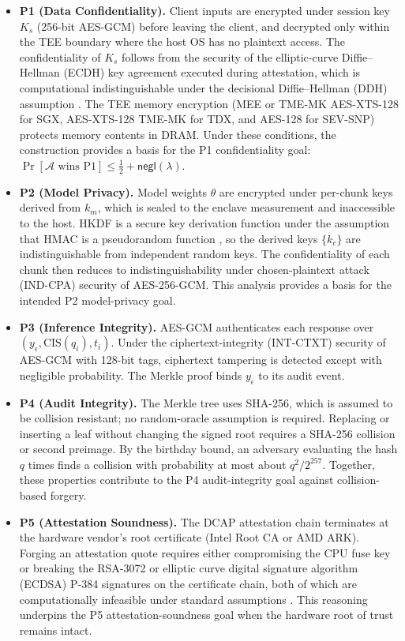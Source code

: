 \documentclass{ieeeaccess}
\begin{document}
\begin{itemize}
\item \textbf{P1 (Data Confidentiality).} Client inputs are encrypted under
session key $K_s$ (256-bit AES-GCM) before leaving the client, and decrypted
only within the TEE boundary where the host OS has no plaintext access.
The confidentiality of $K_s$ follows from the security of the elliptic-curve Diffie--Hellman (ECDH) key agreement executed during attestation, which is computational
indistinguishable under the decisional Diffie--Hellman (DDH) assumption
\cite{boneh1998decision}.
The TEE memory encryption (MEE or TME-MK AES-XTS-128 for SGX, AES-XTS-128
TME-MK for TDX, and AES-128 for SEV-SNP) protects memory contents in DRAM. Under these
conditions, the construction provides a basis for the P1 confidentiality goal:
$\Pr[\mathcal{A} \text{ wins P1}] \leq \frac{1}{2} + \mathsf{negl}(\lambda)$.

\item \textbf{P2 (Model Privacy).} Model weights $\theta$ are encrypted under
per-chunk keys derived from $k_m$, which is sealed to the enclave
measurement and inaccessible to the host. HKDF is a secure key
derivation function under the assumption that HMAC is a pseudorandom function
\cite{krawczyk2010cryptographic}, so the derived keys $\{k_c\}$ are
indistinguishable from independent random keys. The confidentiality of each
chunk then reduces to indistinguishability under chosen-plaintext attack
(IND-CPA) security of AES-256-GCM. This analysis provides a basis
for the intended P2 model-privacy goal.

\item \textbf{P3 (Inference Integrity).} AES-GCM authenticates each response
over $(y_\epsilon, \mathrm{CIS}(q_i), t_i)$. Under the ciphertext-integrity
(INT-CTXT) security of AES-GCM \cite{bellare2008foundations} with 128-bit tags, ciphertext
tampering is detected except with negligible probability. The Merkle proof binds $y_\epsilon$ to its audit event.

\item \textbf{P4 (Audit Integrity).} The Merkle tree uses SHA-256, which is
assumed to be collision resistant; no random-oracle assumption is required.
Replacing or inserting a leaf without changing the signed root requires a
SHA-256 collision or second preimage. By the birthday bound, an adversary
evaluating the hash $q$ times finds a collision with probability at most
about $q^2/2^{257}$. Together,
these properties contribute to the P4 audit-integrity goal against
collision-based forgery.

\item \textbf{P5 (Attestation Soundness).} The DCAP attestation chain terminates
at the hardware vendor's root certificate (Intel Root CA or AMD ARK).
Forging an attestation quote requires either compromising the CPU fuse key
or breaking the RSA-3072 or elliptic curve digital signature algorithm (ECDSA) P-384 signatures on the certificate chain,
both of which are computationally infeasible under standard assumptions
\cite{johnson2016intel, amdsev2020}. This reasoning underpins the P5
attestation-soundness goal when the hardware root of trust remains intact.
\end{itemize}
\end{document}
